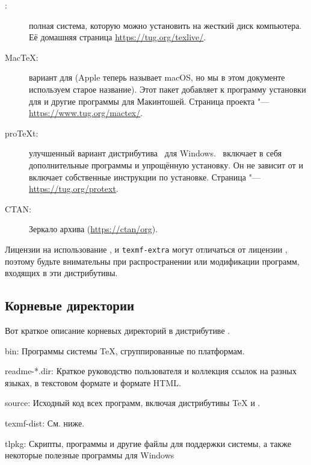 \documentclass{article}
\begin{document}
\begin{description}
  
\item [\TL:] полная система, которую можно установить на жесткий диск
  компьютера.  Её домашняя страница \url{https://tug.org/texlive/}.
  
\item [Mac\TeX:] вариант для \MacOSX{} (Apple теперь называет
  \MacOSX{} macOS, но мы в этом документе используем старое название).
  Этот пакет добавляет к \TL{} программу установки для \MacOSX{} и
  другие программы для Макинтошей.  Страница проекта "---
  \url{https://www.tug.org/mactex/}.

  
\item[pro\TeX{}t:] улучшенный вариант дистрибутива \MIKTEX\ для Windows.
  \ProTeXt\ включает в себя дополнительные программы и упрощённую
  установку.  Он не зависит от \TL{} и включает собственные инструкции
  по установке.   Страница \ProTeXt{} "---
  \url{https://tug.org/protext}.

\item [CTAN:] Зеркало архива \CTAN{} (\url{https://ctan/org}).


\end{description}

Лицензии на использование \CTAN{},  и
\texttt{texmf-extra} могут отличаться от лицензии \TL{}, поэтому будьте
внимательны при распространении или модификации программ, входящих в
эти дистрибутивы.


\subsection{Корневые директории \protect\TL{}}
\label{sec:tld}

Вот краткое описание корневых директорий в дистрибутиве \TL{}.

\begin{ttdescription}
\item[bin:] Программы системы \TeX{}, сгруппированные по платформам.
%
\item[readme-*.dir:] Краткое руководство 
  пользователя и  коллекция ссылок на разных языках, в текстовом
  формате и формате HTML.
%
\item[source:] Исходный код всех программ, включая дистрибутивы \Webc{}
  \TeX{} и \MF{}.
%
\item[texmf-dist:] См.  ниже.
%
\item[tlpkg:] Скрипты, программы и другие файлы для поддержки системы,
  а также некоторые полезные программы для Windows
\end{ttdescription}
\end{document}
